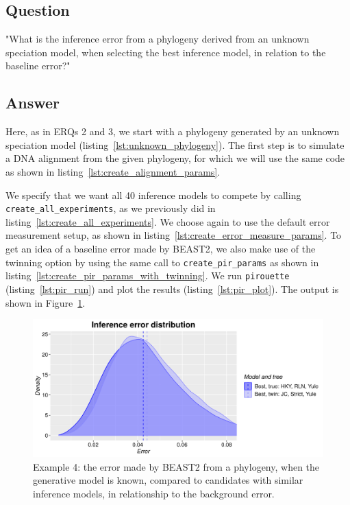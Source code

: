 \subsection{Question}

"What is the inference error from a phylogeny 
derived from an unknown speciation model,
when selecting the best inference model, 
in relation to the baseline error?"

\subsection{Answer}

Here, as in ERQs 2 and 3, we start with a phylogeny 
generated by an unknown speciation model (listing~\ref{lst:unknown_phylogeny}). 
The first step is to simulate a DNA alignment 
from the given phylogeny, for which we will use the same code 
as shown in listing~\ref{lst:create_alignment_params}.

We specify that we want all 40 inference models to compete 
by calling \verb;create_all_experiments;,
as we previously did in listing~\ref{lst:create_all_experiments}.
We choose again to use the default error measurement setup,
as shown in listing~\ref{lst:create_error_measure_params}.
To get an idea of a baseline error made by BEAST2, 
we also make use of the twinning option by using
the same call to \verb;create_pir_params; as shown in 
listing~\ref{lst:create_pir_params_with_twinning}.
We run \verb;pirouette; (listing~\ref{lst:pir_run}) 
and plot the results (listing~\ref{lst:pir_plot}).
The output is shown in Figure~\ref{fig:example_4}. 

\begin{figure}[H]
  \includegraphics[width=\textwidth]{example_4/errors.png}
  \caption{
    Example 4: the error made by BEAST2 from a phylogeny, when the generative 
    model is known, compared to candidates with similar inference models, in 
    relationship to the background error.
  }
  \label{fig:example_4}
\end{figure}


